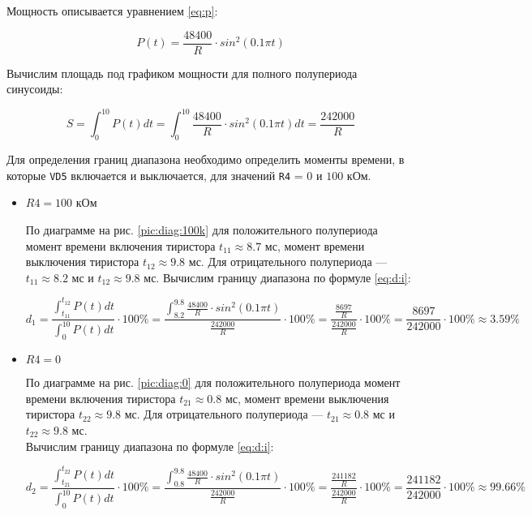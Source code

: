 Мощность описывается уравнением \ref{eq:p}:

\begin{equation}
\label{eq:p}
	P(t) = \frac{48400}{R} \cdot sin^2 \left(0.1 \pi t \right)
\end{equation}

Вычислим площадь под графиком мощности для полного полупериода синусоиды:

\begin{displaymath}
	S = \int_{0}^{10} P(t) dt = \int_{0}^{10} \frac{48400}{R} \cdot sin^2 \left(0.1 \pi t \right) dt = \frac{242000}{R}
\end{displaymath}

Для определения границ диапазона необходимо определить моменты времени, в которые \verb+VD5+ включается и выключается, для значений \verb+R4+ = $0$ и $100$ кОм.

\begin{itemize}

	\item $R4 = 100$ кОм
	
		По диаграмме на рис. \ref{pic:diag:100k} для положительного полупериода момент времени включения тиристора $t_{11} \approx 8.7$ мс, момент времени выключения тиристора $t_{12} \approx 9.8$ мс. Для отрицательного полупериода --- $t_{11} \approx 8.2$ мс и $t_{12} \approx 9.8$ мс.
		Вычислим границу диапазона по формуле \ref{eq:d:i}:
		
		\begin{displaymath}
			d_1 = \frac{\int_{t_{11}}^{t_{12}} P(t) dt}{\int_{0}^{10} P(t) dt} \cdot 100\% = \frac{\int_{8.2}^{9.8} \frac{48400}{R} \cdot sin^2 \left(0.1 \pi t \right)}{\frac{242000}{R}} \cdot 100\% = \frac{\frac{8697}{R}}{\frac{242000}{R}} \cdot 100\% = \frac{8697}{242000} \cdot 100\% \approx 3.59 \%
		\end{displaymath}		
		
	\item $R4 = 0$
	
		По диаграмме на рис. \ref{pic:diag:0} для положительного полупериода момент времени включения тиристора $t_{21} \approx 0.8$ мс, момент времени выключения тиристора $t_{22} \approx 9.8$ мс. Для отрицательного полупериода --- $t_{21} \approx 0.8$ мс и $t_{22} \approx 9.8$ мс.\\
		Вычислим границу диапазона по формуле \ref{eq:d:i}:
		
		\begin{displaymath}
			d_2 = \frac{\int_{t_{21}}^{t_{22}} P(t) dt}{\int_{0}^{10} P(t) dt} \cdot 100\% = \frac{\int_{0.8}^{9.8} \frac{48400}{R} \cdot sin^2 \left(0.1 \pi t \right)}{\frac{242000}{R}} \cdot 100\% = \frac{\frac{241182}{R}}{\frac{242000}{R}} \cdot 100\% = \frac{241182}{242000} \cdot 100\% \approx 99.66 \%
		\end{displaymath}
		
\end{itemize}

